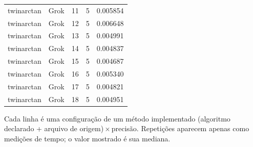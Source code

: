 \begin{longtable}{llrrr}
twinarctan & Grok & 11 & 5 & 0.005854\\
twinarctan & Grok & 12 & 5 & 0.006648\\
twinarctan & Grok & 13 & 5 & 0.004991\\
twinarctan & Grok & 14 & 5 & 0.004837\\
twinarctan & Grok & 15 & 5 & 0.004687\\
twinarctan & Grok & 16 & 5 & 0.005340\\
twinarctan & Grok & 17 & 5 & 0.004821\\
twinarctan & Grok & 18 & 5 & 0.004951\\
\bottomrule
\end{longtable}
\par\smallskip\footnotesize Cada linha é uma configuração de um método implementado (algoritmo declarado + arquivo de origem)\,$\times$\,precisão. Repetições aparecem apenas como medições de tempo; o valor mostrado é sua mediana.\normalsize
